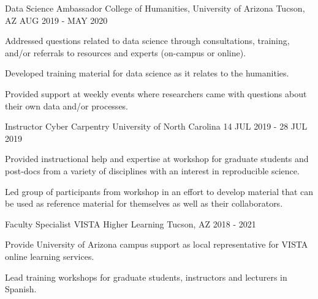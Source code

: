 \begin{cventries}

\cventry
{Data Science Ambassador} %
{College of Humanities, University of Arizona} %
{Tucson, AZ} %
{AUG 2019 - MAY 2020} %
{ %
\begin{cvitems}
\item {Addressed questions related to data science through consultations, training, and/or referrals to resources and experts (on-campus or online).}
\item {Developed training material for data science as it relates to the humanities.}
\item {Provided support at weekly events where researchers came with questions about their own data and/or processes.}
\end{cvitems}
}

\cventry
{Instructor} %
{Cyber Carpentry} %
{University of North Carolina} %
{14 JUL 2019 - 28 JUL 2019} %
{ %
\begin{cvitems}
\item {Provided instructional help and expertise at workshop for graduate students and post-docs from a variety of disciplines with an interest in reproducible science.}
\item {Led group of participants from workshop in an effort to develop material that can be used as reference material for themselves as well as their collaborators.}
\end{cvitems}
}


\cventry
{Faculty Specialist} %
{VISTA Higher Learning} %
{Tucson, AZ} %
{2018 - 2021} %
{ %
\begin{cvitems}
\item {Provide University of Arizona campus support as local representative for VISTA online learning services.}
\item {Lead training workshops for graduate students, instructors and lecturers in Spanish.}
\end{cvitems}
}



\end{cventries}
